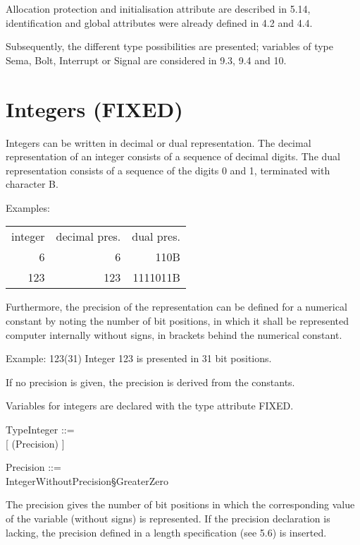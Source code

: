 Allocation protection and initialisation attribute are described in 5.14,
identification and global attributes were already defined in 4.2 and
4.4.

Subsequently, the different type possibilities are presented; variables
of type Sema, Bolt, Interrupt or Signal are considered in 9.3, 9.4 and
10.

\section{Integers (FIXED)}   %

Integers can be written in decimal or dual representation. The decimal
representation of an integer consists of a sequence of decimal digits. The dual
representation consists of a sequence of the digits 0 and 1, terminated
with character B.

Examples:

\begin{tabular}{rrr}
integer & decimal pres. & dual pres. \\
      6 &             6 &     110B \\
    123 &           123 & 1111011B
\end{tabular}

Furthermore, the precision of the representation can be defined for a
numerical constant by noting the number of bit positions, in which it
shall be represented computer internally without signs, in brackets behind
the numerical constant.

Example: 123(31) \x Integer 123 is presented in 31 bit positions.

If no precision is given, the precision is derived from the constants.

Variables for integers are declared with the type attribute FIXED.

\begin{front}
TypeInteger ::=\\
 [ (Precision) ]

Precision ::=\\
\x IntegerWithoutPrecision\S GreaterZero
\end{front}
\begin{grammar}





\end{grammar}

The precision gives the number of bit positions in which the
corresponding value of the variable (without signs) is represented. If
the precision declaration is lacking, the precision defined in a length
specification (see 5.6) is inserted. 

